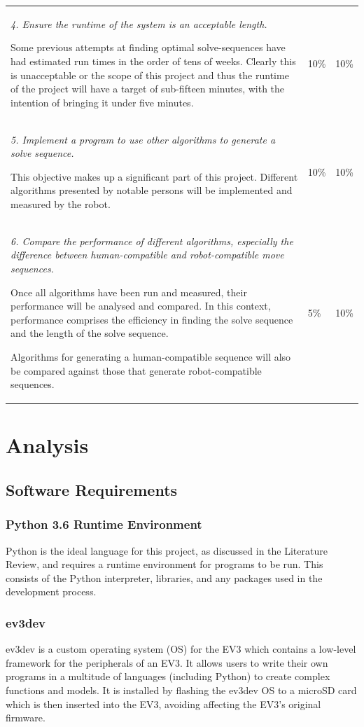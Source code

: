 \documentclass{report}
\begin{document}
\begin{longtable}[h]{m{}M{0.15\textwidth}M{0.15\textwidth}}
		\textit{4. Ensure the runtime of the system is an acceptable length.} \par Some previous attempts at finding optimal solve-sequences have had estimated run times in the order of tens of weeks. Clearly this is unacceptable or the scope of this project and thus the runtime of the project will have a target of sub-fifteen minutes, with the intention of bringing it under five minutes. & 10\% & 10\% \\
		\textit{5. Implement a program to use other algorithms to generate a solve sequence.} \par This objective makes up a significant part of this project. Different algorithms presented by notable persons will be implemented and measured by the robot. & 10\% & 10\% \\
		\textit{6. Compare the performance of different algorithms, especially the difference between human-compatible and robot-compatible move sequences.} \par Once all algorithms have been run and measured, their performance will be analysed and compared. In this context, performance comprises the efficiency in finding the solve sequence and the length of the solve sequence. \par Algorithms for generating a human-compatible sequence will also be compared against those that generate robot-compatible sequences. & 5\% & 10\% \\
    	\bottomrule
    \end{longtable}
    
    \section{Analysis}
    \subsection{Software Requirements}
    \subsubsection{Python 3.6 Runtime Environment}
    Python is the ideal language for this project, as discussed in the Literature Review, and requires a runtime environment for programs to be run. This consists of the Python interpreter, libraries, and any packages used in the development process.
    \subsubsection{ev3dev}
    ev3dev \cite{Ev3dev.org} is a custom operating system (OS) for the EV3 which contains a low-level framework for the peripherals of an EV3. It allows users to write their own programs in a multitude of languages (including Python) to create complex functions and models. It is installed by flashing the ev3dev OS to a microSD card which is then inserted into the EV3, avoiding affecting the EV3's original firmware.
    
\end{document}
